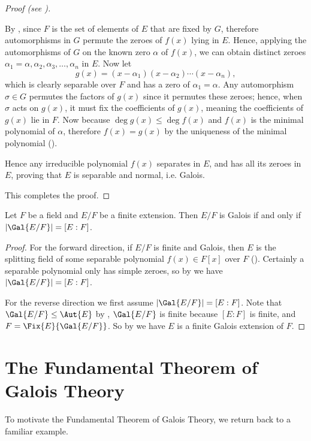 \begin{proof}[Proof (see {\cite[Theorem 23.19]{judson_beezer_2022}})]
\begin{itemize}
        By , since $F$ is the set of elements of $E$ that are fixed by $G$, therefore automorphisms in $G$ permute the zeroes of $f(x)$ lying in $E$. Hence, applying the automorphisms of $G$ on the known zero $\alpha$ of $f(x)$, we can obtain distinct zeroes $\alpha_1 = \alpha, \alpha_2, \alpha_3, \dots, \alpha_n$ in $E$. Now let
        \[
            g(x) = (x-\alpha_1)(x-\alpha_2)\cdots(x-\alpha_n),
        \]
        which is clearly separable over $F$ and has a zero of $\alpha_1 = \alpha$. Any automorphism $\sigma \in G$ permutes the factors of $g(x)$ since it permutes these zeroes; hence, when $\sigma$ acts on $g(x)$, it must fix the coefficients of $g(x)$, meaning the coefficients of $g(x)$ lie in $F$. Now because $\deg g(x) \leq \deg f(x)$ and $f(x)$ is the minimal polynomial of $\alpha$, therefore $f(x) = g(x)$ by the uniqueness of the minimal polynomial ().
        
        Hence any irreducible polynomial $f(x)$ separates in $E$, and has all its zeroes in $E$, proving that $E$ is separable and normal, i.e. Galois.
    \end{itemize}
    This completes the proof.
\end{proof}

\begin{corollary}\label{corollary-galois-iff-galois-field-has-order-of-degree-of-field-extension}
    Let $F$ be a field and $E/F$ be a finite extension. Then $E/F$ is Galois if and only if $|\Gal{E/F}| = [E:F]$.
\end{corollary}
\begin{proof}
    For the forward direction, if $E/F$ is finite and Galois, then $E$ is the splitting field of some separable polynomial $f(x) \in F[x]$ over $F$ (). Certainly a separable polynomial only has simple zeroes, so by  we have $|\Gal{E/F}| = [E:F]$.

    For the reverse direction we first assume $|\Gal{E/F}| = [E:F]$. Note that $\Gal{E/F} \leq \Aut{E}$ by , $\Gal{E/F}$ is finite because $[E:F]$ is finite, and $F = \Fix{E}{\Gal{E/F}}$. So by  we have $E$ is a finite Galois extension of $F$.
\end{proof}

\section{The Fundamental Theorem of Galois Theory}
To motivate the Fundamental Theorem of Galois Theory, we return back to a familiar example.

